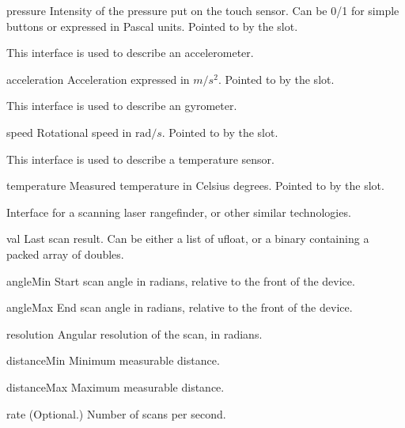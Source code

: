 \begin{urbiscriptapi}
\item[pressure] Intensity of the pressure put on the touch sensor. Can be
  0/1 for simple buttons or expressed in Pascal units. Pointed to by the
   slot.
\end{urbiscriptapi}



This interface is used to describe an accelerometer.

\begin{urbiscriptapi}
\item[acceleration] Acceleration expressed in $m/s^2$.  Pointed to by the
   slot.
\end{urbiscriptapi}

This interface is used to describe an gyrometer.

\begin{urbiscriptapi}
\item[speed] Rotational speed in $\mathrm{rad}/s$.  Pointed to by the
   slot.
\end{urbiscriptapi}

This interface is used to describe a temperature sensor.

\begin{urbiscriptapi}
\item[temperature] Measured temperature in Celsius degrees.  Pointed to by
  the  slot.
\end{urbiscriptapi}

Interface for a scanning laser rangefinder, or other similar technologies.

\begin{urbiscriptapi}
\item[val] Last scan result. Can be either a list of ufloat, or a binary
  containing a packed array of doubles.

\item[angleMin] Start scan angle in radians, relative to the front of the
  device.

\item[angleMax] End scan angle in radians, relative to the front of the
  device.

\item[resolution] Angular resolution of the scan, in radians.

\item[distanceMin] Minimum measurable distance.

\item[distanceMax] Maximum measurable distance.

\item[rate] (Optional.) Number of scans per second.
\end{urbiscriptapi}

